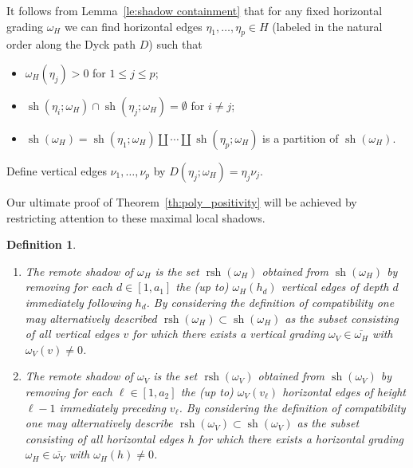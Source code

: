 \documentclass{amsart}
\newtheorem{definition}[theorem]{Definition}
\newcommand{\rsh}{\operatorname{rsh}}
\newcommand{\sh}{\operatorname{sh}}
\newenvironment{enumeratea}{\begin{enumerate}[\upshape (a)]}
                           {\end{enumerate}}
\begin{document}
 It follows from Lemma~\ref{le:shadow containment} that for any fixed horizontal grading $\omega_H$ we can find horizontal edges $\eta_1,\ldots,\eta_p\in H$ (labeled in the natural order along the Dyck path $D$) such that
 \begin{itemize}
  \item $\omega_H(\eta_j)>0$ for $1\le j\le p$;
  \item $\sh(\eta_i;\omega_H)\cap\sh(\eta_j;\omega_H)=\emptyset$ for $i\ne j$;
  \item $\sh(\omega_H)=\sh(\eta_1;\omega_H)\amalg\cdots\amalg\sh(\eta_p;\omega_H)$ is a partition of $\sh(\omega_H)$.
 \end{itemize}
 Define vertical edges $\nu_1,\ldots,\nu_p$ by $D(\eta_j;\omega_H)=\eta_j\nu_j$.
   
 Our ultimate proof of Theorem~\ref{th:poly_positivity} will be achieved by restricting attention to these maximal local shadows.

 \begin{definition}\mbox{}
  \begin{enumeratea}
   \item The \emph{remote shadow} of $\omega_H$ is the set $\rsh(\omega_H)$ obtained from $\sh(\omega_H)$ by removing for each $d\in[1,a_1]$ the (up to) $\omega_H(h_d)$ vertical edges of depth $d$ immediately following $h_d$.  By considering the definition of compatibility one may alternatively described $\rsh(\omega_H)\subset\sh(\omega_H)$ as the subset consisting of all vertical edges $v$ for which there exists a vertical grading $\omega_V\in\overline{\omega_H}$ with $\omega_V(v)\ne0$.
   \item The \emph{remote shadow} of $\omega_V$ is the set $\rsh(\omega_V)$ obtained from $\sh(\omega_V)$ by removing for each $\ell\in[1,a_2]$ the (up to) $\omega_V(v_\ell)$ horizontal edges of height $\ell-1$ immediately preceding $v_\ell$.  By considering the definition of compatibility one may alternatively describe $\rsh(\omega_V)\subset\sh(\omega_V)$ as the subset consisting of all horizontal edges $h$ for which there exists a horizontal grading $\omega_H\in\overline{\omega_V}$ with $\omega_H(h)\ne0$.
  \end{enumeratea}
 \end{definition}
 
\end{document}
